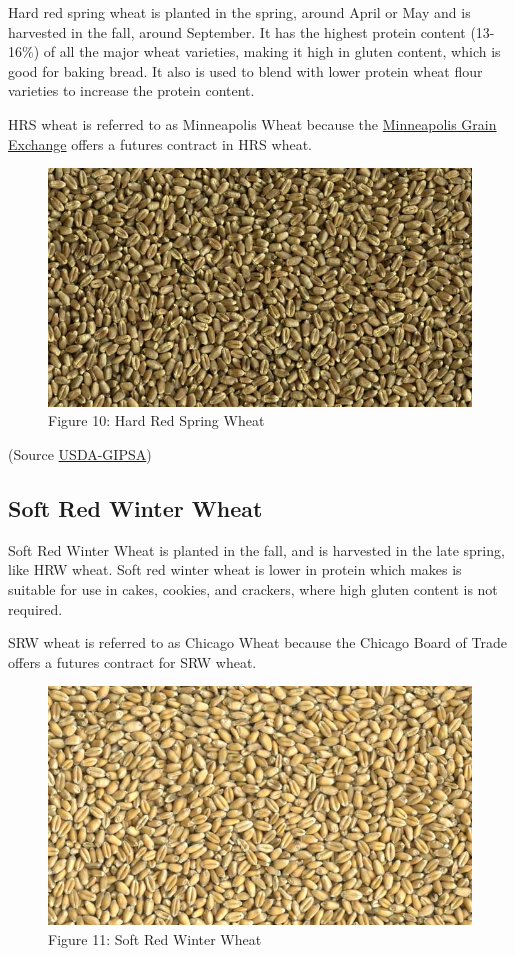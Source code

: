 \documentclass[]{book}
\theoremstyle{definition}
\theoremstyle{definition}
\theoremstyle{remark}
\begin{document}
Hard red spring wheat is planted in the spring, around April or May and
is harvested in the fall, around September. It has the highest protein
content (13-16\%) of all the major wheat varieties, making it high in
gluten content, which is good for baking bread. It also is used to blend
with lower protein wheat flour varieties to increase the protein
content.

HRS wheat is referred to as Minneapolis Wheat because the
\href{http://www.mgex.com/}{Minneapolis Grain Exchange} offers a futures
contract in HRS wheat.

\begin{figure}[htbp]
\centering
\includegraphics{images/HRS-Wheat.jpg}
\caption{Figure 10: Hard Red Spring Wheat}
\end{figure}

(Source
\href{https://www.gipsa.usda.gov/fgis/commgallery/gr_hrs.aspx}{USDA-GIPSA})

\subsection{Soft Red Winter Wheat}\label{soft-red-winter-wheat}

Soft Red Winter Wheat is planted in the fall, and is harvested in the
late spring, like HRW wheat. Soft red winter wheat is lower in protein
which makes is suitable for use in cakes, cookies, and crackers, where
high gluten content is not required.

SRW wheat is referred to as Chicago Wheat because the Chicago Board of
Trade offers a futures contract for SRW wheat.

\begin{figure}[htbp]
\centering
\includegraphics{images/SRW-Wheat.jpg}
\caption{Figure 11: Soft Red Winter Wheat}
\end{figure}
\end{document}

